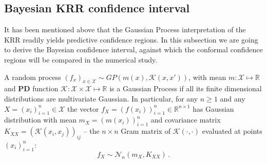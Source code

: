 \documentclass{ITaSconf}
\newcommand{\Ncal}{\mathcal{N}}
\newcommand{\Kcal}{\mathcal{K}}
\newcommand{\Xcal}{\mathcal{X}}
\newcommand{\Real}{\mathbb{R}}
\begin{document}

\subsection{Bayesian KRR confidence interval} %
\label{sub:bayesian_krr_confidence_interval}

It has been mentioned above that the Gaussian Process interpretation of the KRR
readily yields predictive confidence regions. In this subsection we are going to
derive the Bayesian confidence interval, against which the conformal confidence
regions will be compared in the numerical study.

A random process $(f_x)_{x\in \Xcal} \sim GP(m(x), \Kcal(x,x'))$, with mean $m : \Xcal
\mapsto \Real$ and \textbf{PD} function $\Kcal : \Xcal \times \Xcal \mapsto \Real$
is a Gaussian Process if all its finite dimensional distributions are multivariate
Gaussian. In particular, for any $n\geq1$ and any $X = (x_i)_{i=1}^n \in \Xcal$ the
vector $f_X = (f(x_i))_{i=1}^n \in \Real^{n\times 1}$ has Gaussian distribution with
mean $m_X = (m(x_i))_{i=1}^n$ and covariance matrix $K_{XX} = (\Kcal(x_i,x_j))_{ij}$ --
the $n\times n$ Gram matrix of $\Kcal(\cdot,\cdot)$ evaluated at points $(x_i)_{i=1}^n$:
\begin{equation*}
  f_X \sim \Ncal_n(m_X, K_{XX}) \,.
\end{equation*}
\end{document}

